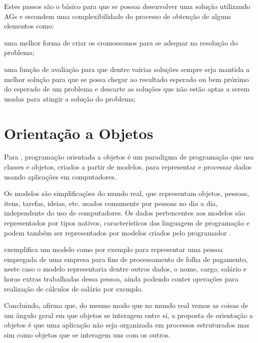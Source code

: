 \par Estes passos são o básico para que se possoa desenvolver uma solução
utilizando AGs e escondem uma complexibilidade do processo de obtenção de alguns
elementos como:
\item uma melhor forma de criar os cromossomos para se adequar na resolução do
problema;
\item uma função de avaliação para que dentre vairias soluções
sempre seja mantida a melhor solução para que se possa chegar ao resultado
esperado ou bem próximo do esperado de um problema e descarte as soluções que
não estão aptas a serem usadas para atingir a solução do problema;

\section{Orientação a Objetos}

\par Para ,
programação orientada a objetos é um paradigma de programação que usa
classes e objetos, criados a partir de modelos, para representar e processar
dados usando aplicações em computadores.

\par Os modelos são simplificações do mundo real, que representam
objetos, pessoas, itens, tarefas, ideias, etc. usados comumente por
pessoas no dia a dia, independente do uso de computadores. 
Os dados pertencentes aos modelos são representados por tipos nativos,
característicos das linguagem de programação e podem também ser representados
por modelos criados pelo
programador \cite{livro_intro_a_prog_orientada_objetos_usando_java}.

\par {}
exemplifica um modelo como por exemplo para representar uma pessoa empregada de
uma empresa para fins de processamento de folha de pagamento, neste caso o
modelo representaria dentre outros dados, o nome, cargo, salário e horas extras
trabalhadas dessa pessoa, ainda podendo conter operações para realização
de cálculos de salário por exemplo.


\par Concluindo,  afirma que, do mesmo modo 
que no mundo real vemos as coisas de um ângulo geral em que objetos se
interagem entre si, a proposta de orientação a objetos é que uma  
aplicação não seja organizada em processos estruturados mas
sim como objetos que se interagem uns com os outros.

